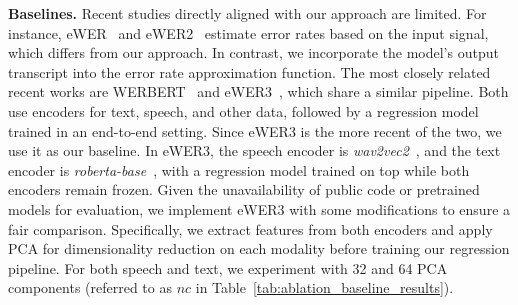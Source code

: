\noindent\textbf{Baselines.} 
Recent studies directly aligned with our approach are limited. For instance, eWER~\cite{ali-renals-2018-word} and eWER2~\cite{Ali2020WordER} estimate error rates based on the input signal, which differs from our approach. In contrast, we incorporate the model's output transcript into the error rate approximation function. The most closely related recent works are WERBERT~\cite{sheshadri-etal-2021-wer} and eWER3~\cite{chowdhury2023multilingualworderrorrate}, which share a similar pipeline. Both use encoders for text, speech, and other data, followed by a regression model trained in an end-to-end setting. Since eWER3 is the more recent of the two, we use it as our baseline. In eWER3, the speech encoder is \emph{wav2vec2}~\cite{baevski2020wav2vec20frameworkselfsupervised}, and the text encoder is \emph{roberta-base}~\cite{liu2019robertarobustlyoptimizedbert}, with a regression model trained on top while both encoders remain frozen. Given the unavailability of public code or pretrained models for evaluation, we implement eWER3 with some modifications to ensure a fair comparison. Specifically, we extract features from both encoders and apply PCA for dimensionality reduction on each modality before training our regression pipeline. For both speech and text, we experiment with 32 and 64 PCA components (referred to as $nc$ in Table~\ref{tab:ablation_baseline_results}).

